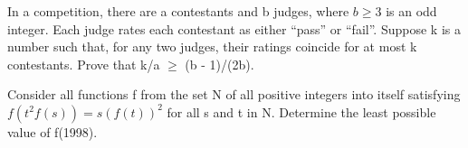 \item In a competition, there are a contestants and b judges, where $b \geq 3$ is an odd integer. Each judge rates each contestant as either “pass” or “fail”. Suppose k is a number such that, for any two judges, their ratings coincide for at most k
contestants. Prove that k/a $\geq$ (b - 1)/(2b).

\item Consider all functions f from the set N of all positive integers into itself satisfying $f(t^2f(s)) = s(f(t))^2$ for all s and t in N. Determine the least possible value of f(1998).





